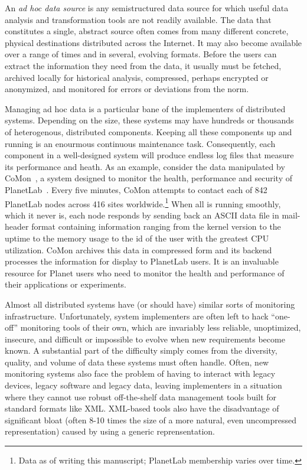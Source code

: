 

An {\em ad hoc data source} is any semistructured data source for
which useful data analysis and transformation tools are not readily
available.  The data that constitutes a single, abstract source 
often comes from many different concrete, physical destinations
distributed across the Internet.  It may also become available
over a range of times and in several, evolving formats.
Before the users can extract the information they need from the data,
it usually must be fetched, archived locally for historical analysis, 
compressed, perhaps encrypted or anonymized, and monitored for errors 
or deviations from the norm.

Managing ad hoc data is a particular bane of the implementers of
distributed systems.  Depending on the size, these systems may have
hundreds or thousands of heterogenous, distributed components.
Keeping all these components up and running is an enourmous continuous
maintenance task.  Consequently, each component in a well-designed
system will produce endless log files that measure its performance and
heath.  As an example, consider the data manipulated by
CoMon~\cite{comon}, a system designed to monitor the health,
performance and security of PlanetLab~\cite{planetlab}.  Every five
minutes, CoMon attempts to contact each of 842 PlanetLab nodes across
416 sites worldwide.\footnote{Data as of writing this manuscript;
PlanetLab membership varies over time.}  When all is running smoothly,
which it never is, each node responds by sending back an ASCII data
file in mail-header format containing information ranging from the
kernel version to the uptime to the memory usage to the id of the user
with the greatest CPU utilization.  CoMon archives this data in
compressed form and its backend processes the information for display
to PlanetLab users.  It is an invaluable resource for Planet users who
need to monitor the health and performance of their applications or
experiments.

Almost all distributed systems have (or should have) similar sorts of
monitoring infrastructure.  Unfortunately, system implementers are
often left to hack ``one-off'' monitoring tools of their own, which
are invariably less reliable, unoptimized, insecure, and difficult or
impossible to evolve when new requirements become known.  A
substantial part of the difficulty simply comes from the diversity,
quality, and volume of data these systems must often handle. Often,
new monitoring systems also face the problem of having to interact
with legacy devices, legacy software and legacy data, leaving
implementers in a situation where they cannot use robust off-the-shelf
data management tools built for standard formats like XML.  XML-based
tools also have the disadvantage of significant bloat (often 8-10 times
the size of a more natural, even uncompressed representation) caused by
using a generic reprensentation.

